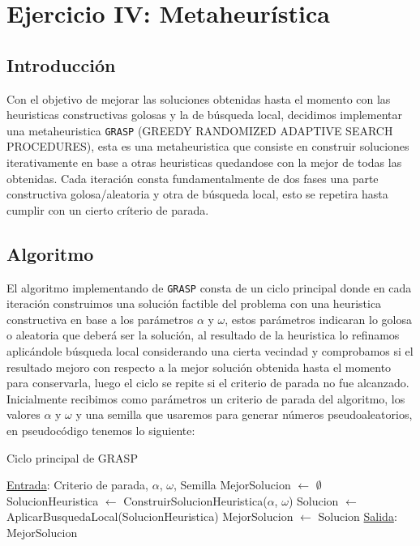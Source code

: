 \section{Ejercicio IV: Metaheur\'istica}

\subsection{Introducci\'on}

Con el objetivo de mejorar las soluciones obtenidas hasta el momento con las heuristicas constructivas golosas y la de búsqueda local, decidimos implementar una metaheuristica \texttt{GRASP} (GREEDY RANDOMIZED ADAPTIVE SEARCH PROCEDURES), esta es una metaheuristica que consiste en construir soluciones iterativamente en base a otras heuristicas quedandose con la mejor de todas las obtenidas. Cada iteración consta fundamentalmente de dos fases una parte constructiva golosa/aleatoria y otra de búsqueda local, esto se repetira hasta cumplir con un cierto críterio de parada.

\subsection{Algoritmo}

El algoritmo implementando de \texttt{GRASP} consta de un ciclo principal donde en cada iteración construimos una solución factible del problema con una heuristica constructiva en base a los parámetros $\alpha$ y $\omega$, estos parámetros indicaran lo golosa o aleatoria que deberá ser la solución, al resultado de la heuristica lo refinamos aplicándole búsqueda local considerando una cierta vecindad y comprobamos si el resultado mejoro con respecto a la mejor solución obtenida hasta el momento para conservarla, luego el ciclo se repite si el criterio de parada no fue alcanzado. Inicialmente recibimos como parámetros un criterio de parada del algoritmo, los valores $\alpha$ y $\omega$ y una semilla que usaremos para generar números pseudoaleatorios, en pseudocódigo tenemos lo siguiente:


\begin{algorithm}[H]

\label{}
\caption{Ciclo principal de GRASP}

\begin{algorithmic}[1]

\Statex \underline{Entrada}: Criterio de parada, $\alpha$, $\omega$, Semilla
\medskip
\State MejorSolucion $\gets$ $\emptyset$
    \State SolucionHeuristica $\gets$ ConstruirSolucionHeuristica($\alpha$, $\omega$)
	\State Solucion $\gets$ AplicarBusquedaLocal(SolucionHeuristica)
		\State MejorSolucion $\gets$ Solucion
	\EndIf
\EndWhile
\medskip
\Statex \underline{Salida}: MejorSolucion

\end{algorithmic}
\end{algorithm}


